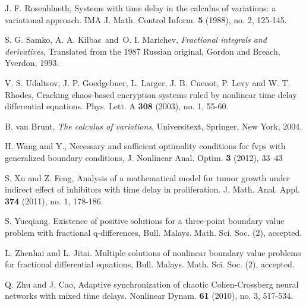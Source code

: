 \documentclass[10pt]{article}
\begin{document}
\begin{thebibliography}{99}
J. F. Rosenblueth,
Systems with time delay in the calculus of variations: a variational approach.
IMA J. Math. Control Inform. {\bf 5} (1988), no. 2, 125-145.

S. G. Samko, A. A. Kilbas\ and\ O. I. Marichev,
{\it Fractional integrals and derivatives},
Translated from the 1987 Russian original,
Gordon and Breach, Yverdon, 1993.

V. S. Udaltsov, J. P. Goedgebuer, L. Larger, J. B. Cuenot, P. Levy and W. T. Rhodes,
Cracking chaos-based encryption systems ruled by nonlinear time delay differential equations.
Phys. Lett. A {\bf 308} (2003), no. 1, 55-60.

B. van Brunt,
{\it The calculus of variations},
Universitext, Springer, New York, 2004.

H. Wang and Y., 
Necessary and sufficient optimality conditions for fvps with generalized boundary conditions, 
J. Nonlinear Anal. Optim. {\bf 3} (2012), 33--43

S. Xu and Z. Feng,
Analysis of a mathematical model for tumor growth under indirect effect of inhibitors with time delay in proliferation.
J. Math. Anal. Appl. {\bf 374} (2011), no. 1, 178-186.

S. Yueqiang. 
Existence of positive solutions for a three-point boundary value problem with fractional q-differences, 
Bull. Malays. Math. Sci. Soc. (2), accepted.

L. Zhenhai and L. Jitai. Multiple solutions of nonlinear boundary value problems for fractional differential equations,
Bull. Malays. Math. Sci. Soc. (2), accepted.

Q. Zhu and J. Cao,
Adaptive synchronization of chaotic Cohen-Crossberg neural networks with mixed time delays.
Nonlinear Dynam. {\bf 61} (2010), no. 3, 517-534.

\end{thebibliography}
\end{document}
